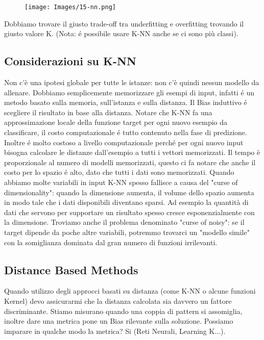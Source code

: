 \documentclass{article}
\begin{document}
\begin{figure}[H]
\centering
\texttt{[image: Images/15-nn.png]}
\end{figure}

Dobbiamo trovare il giusto trade-off tra underfitting e overfitting trovando il giusto valore K. (Nota: é possibile usare K-NN anche se ci sono più classi).

\subsection{Considerazioni su K-NN}
Non c'è una ipotesi globale per tutte le istanze: non c'è quindi nessun modello da allenare. Dobbiamo semplicemente memorizzare gli esempi di input, infatti é un metodo basato sulla memoria, sull'istanza e sulla distanza. Il Bias induttivo é scegliere il risultato in base alla distanza. \newline
Notare che K-NN fa una approssimazione locale della funzione target per ogni nuovo esempio da classificare, il costo computazionale é tutto contenuto nella fase di predizione. Inoltre é molto costoso a livello computazionale perché per ogni nuovo input bisogna calcolare le distanze dall'esempio a tutti i vettori memorizzati. Il tempo è proporzionale al numero di modelli memorizzati, questo ci fa notare che anche il costo per lo spazio é alto, dato che tutti i dati sono memorizzati. \newline
Quando abbiamo molte variabili in input K-NN spesso fallisce a causa del "curse of dimensionality": quando la dimensione aumenta, il volume dello spazio aumenta in modo tale che i dati disponibili diventano sparsi. Ad esempio la quantità di dati che servono per supportare un risultato spesso cresce esponenzialmente con la dimensione. Troviamo anche il problema denominato "curse of noisy": se il target dipende da poche altre variabili, potremmo trovarci un "modello simile" con la somiglianza dominata dal gran numero di funzioni irrilevanti. 

\subsection{Distance Based Methods}
Quando utilizzo degli approcci basati su distanza (come K-NN o alcune funzioni Kernel) devo assicurarmi che la distanza calcolata sia davvero un fattore discriminante. Stiamo misurano quando una coppia di pattern si assomiglia, inoltre dare una metrica pone un Bias rilevante sulla soluzione. Possiamo imparare in qualche modo la metrica? Si (Reti Neurali, Learning K...). 
\end{document}
